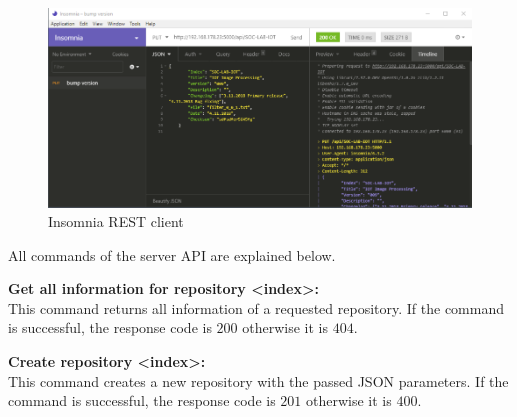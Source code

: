 \begin{figure}[htbp]
    \centering
    \includegraphics[width=1\textwidth]{images/insomnia.png}
    \caption{\label{fig:insomnia} Insomnia REST client}
\end{figure}

All commands of the server API are explained below.
\medbreak

\newcommand{\specialcell}[2][c]{%
  \begin{tabular}[#1]{@{}c@{}}#2\end{tabular}}

\textbf{Get all information for repository <index>:}\\
This command returns all information of a requested repository. If the command is successful, the response code is $200$ otherwise it is $404$.

\begin{table}[htbp]
    \centering
\end{table}

\textbf{Create repository <index>:}\\
This command creates a new repository with the passed JSON parameters. If the command is successful, the response code is $201$ otherwise it is $400$.

\begin{table}[htbp]
    \centering
\end{table}

